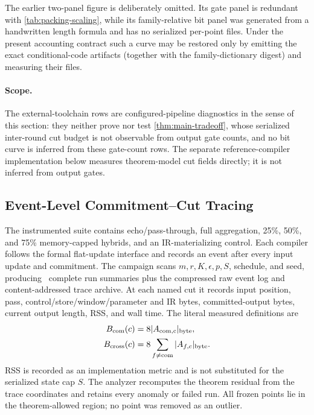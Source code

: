 \documentclass[aps,prx,reprint,floatfix,superscriptaddress]{revtex4-2}
\begin{document}
The earlier two-panel figure is deliberately omitted.  Its gate panel is
redundant with \cref{tab:packing-scaling}, while its family-relative bit panel
was generated from a handwritten length formula and has no serialized
per-point files.  Under the present accounting contract such a curve may be
restored only by emitting the exact conditional-code artifacts (together with
the family-dictionary digest) and measuring their files.

\paragraph{Scope.}
The external-toolchain rows are configured-pipeline diagnostics in the
sense of this section: they neither prove nor test
\cref{thm:main-tradeoff}, whose serialized inter-round cut budget is not
observable from output gate counts, and no bit curve is inferred from these
gate-count rows.  The separate reference-compiler implementation below
measures theorem-model cut fields directly; it is not inferred from output
gates.

\subsection{Event-Level Commitment--Cut Tracing}
\label{sec:cut-tracing}

The instrumented suite contains echo/pass-through, full aggregation, 25\%,
50\%, and 75\% memory-capped hybrids, and an IR-materializing control.  Each
compiler follows the formal flat-update interface and records an event after
every input update and commitment.  The campaign scans $m,r,K,\epsilon,p,S$,
schedule, and seed, producing \TradeoffRuns\ complete run summaries plus the
compressed raw event log and content-addressed trace archive.  At each named
cut it records input position, pass, control/store/window/parameter and IR
bytes, committed-output bytes, current output length, RSS, and wall time.
The literal measured definitions are
\begin{equation*}
\begin{aligned}
 B_{\rm com}(c)&=8|A_{\rm com,c}|_{\rm byte},\\
 B_{\rm cross}(c)&=8\sum_{f\neq\mathrm{com}}|A_{f,c}|_{\rm byte}.
\end{aligned}
\end{equation*}
RSS is recorded as an implementation metric and is not substituted for the
serialized state cap $S$.  The analyzer recomputes the theorem residual from
the trace coordinates and retains every anomaly or failed run.  All frozen
points lie in the theorem-allowed region; no point was removed as an outlier.
\end{document}
